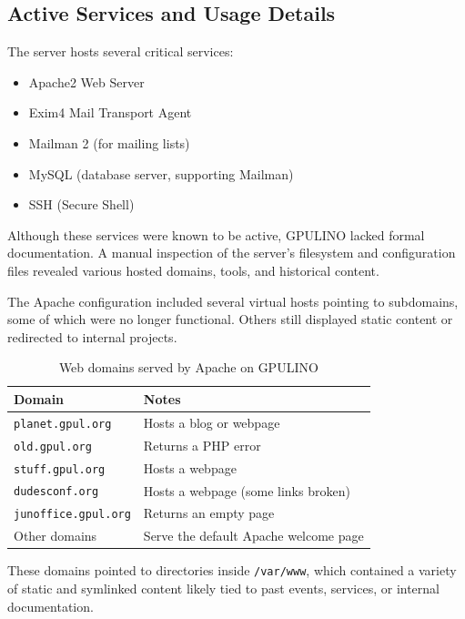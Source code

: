 \subsection*{Active Services and Usage Details}

The server hosts several critical services:
\begin{itemize}
    \item Apache2 Web Server
    \item Exim4 Mail Transport Agent
    \item Mailman 2 (for mailing lists)
    \item MySQL (database server, supporting Mailman)
    \item SSH (Secure Shell)
\end{itemize}

Although these services were known to be active, GPULINO lacked formal documentation. A manual inspection of the server's filesystem and configuration files revealed various hosted domains, tools, and historical content.

The Apache configuration included several virtual hosts pointing to subdomains, some of which were no longer functional. Others still displayed static content or redirected to internal projects.

\begin{table}[H]
  \centering
  \caption{Web domains served by Apache on GPULINO}
  \label{tab:gpulino_apache_domains}
  \begin{tabular}{ll}
    \rowcolor{udcpink!25}
    \textbf{Domain} & \textbf{Notes} \\
    \hline
    \texttt{planet.gpul.org} & Hosts a blog or webpage \\
    \texttt{old.gpul.org} & Returns a PHP error \\
    \texttt{stuff.gpul.org} & Hosts a webpage \\
    \texttt{dudesconf.org} & Hosts a webpage (some links broken) \\
    \texttt{junoffice.gpul.org} & Returns an empty page \\
    Other domains & Serve the default Apache welcome page \\
  \end{tabular}
\end{table}

These domains pointed to directories inside \texttt{/var/www}, which contained a variety of static and symlinked content likely tied to past events, services, or internal documentation.

